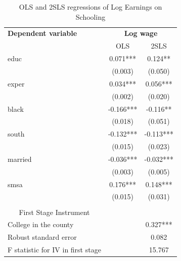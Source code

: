 \documentclass{beamer}
\begin{document}
\begin{frame}[plain]

  \begin{table}[htbp]\centering
    \scriptsize
    \caption{OLS and 2SLS regressions of Log Earnings on Schooling}
    \label{2sls_1}
    \begin{center}
      \begin{threeparttable}
        \begin{tabular}{l*{2}{c}}
          \toprule
          \multicolumn{1}{l}{\textbf{Dependent variable}}&
          \multicolumn{2}{c}{\textbf{Log wage}}\\
          \multicolumn{1}{c}{}&
          \multicolumn{1}{c}{OLS}&
          \multicolumn{1}{c}{2SLS}\\
          \midrule
          educ                              & 0.071***  & 0.124**   \\
                                            & (0.003)   & (0.050)   \\
          exper                             & 0.034***  & 0.056***  \\
                                            & (0.002)   & (0.020)   \\
          black                             & -0.166*** & -0.116**  \\
                                            & (0.018)   & (0.051)   \\
          south                             & -0.132*** & -0.113*** \\
                                            & (0.015)   & (0.023)   \\
          married                           & -0.036*** & -0.032*** \\
                                            & (0.003)   & (0.005)   \\
          smsa                              & 0.176***  & 0.148***  \\
                                            & (0.015)   & (0.031)   \\
          \\
          \midrule
          \multicolumn{1}{c}{First Stage Instrument}\\
          College in the county             &           & 0.327***  \\
          Robust standard error             &           & 0.082     \\
          F statistic for IV in first stage &           & 15.767    \\

\end{tabular}
\end{threeparttable}
\end{center}
\end{table}
\end{frame}
\end{document}
